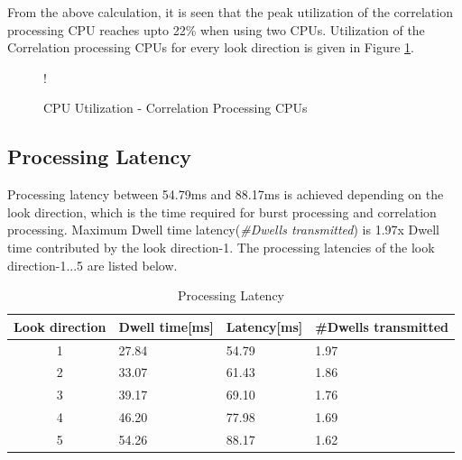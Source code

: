 From the above calculation, it is seen that the peak utilization of the correlation processing CPU reaches upto 22\% when using two CPUs. Utilization of the Correlation processing CPUs for every look direction is given in Figure \ref{sch4:chrt:corr_cpu_util}.

\begin{figure}[h!]
\centering
\resizebox {10cm} {!} {
}
\caption{CPU Utilization - Correlation Processing CPUs}
\label{sch4:chrt:corr_cpu_util}
\end{figure}

\subsection{Processing Latency}
\label{ss:mm:scheme5:latency}
Processing latency between 54.79ms and 88.17ms is achieved depending on the look direction, which is the time required for burst processing and correlation processing. Maximum Dwell time latency(\textsl{\#Dwells transmitted}) is 1.97x Dwell time contributed by the look direction-1. The processing latencies of the look direction-1...5 are listed below. 

\begin{table}[h!]
	\centering
	\begin{tabular}{|c|l|l|l|} 
	 \hline
	 \textbf{Look direction} & \textbf{Dwell time[ms]} & \textbf{Latency[ms]} & \textbf{\#Dwells transmitted} \\
	 \hline
	 1 & 27.84 & 54.79 & 1.97 \\ \hline
	 2 & 33.07 & 61.43 & 1.86 \\ \hline
	 3 & 39.17 & 69.10 & 1.76 \\ \hline
	 4 & 46.20 & 77.98 & 1.69 \\ \hline
	 5 & 54.26 & 88.17 & 1.62 \\ \hline
	\end{tabular}
	\caption{Processing Latency}
	\label{tbl:mm:scheme5_latency}
\end{table}


